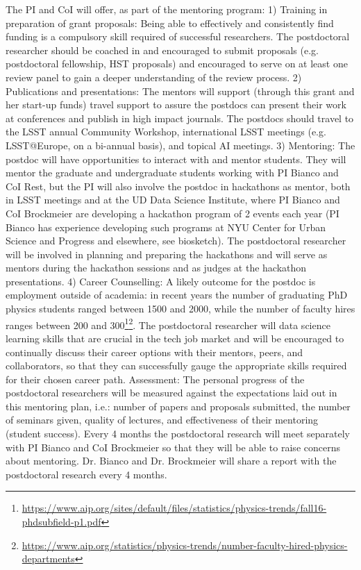 The PI and CoI will offer, as part of the mentoring program: 
1) Training in preparation of grant proposals: Being able to effectively and consistently find funding is a compulsory skill required of successful researchers.  The postdoctoral researcher should be coached in and encouraged to submit proposals (e.g. postdoctoral fellowship, HST proposals) and encouraged to serve on at least one review panel to gain a deeper understanding of the review process. 
2) Publications and presentations: The mentors will support (through this grant and her start-up funds) travel support to assure the postdocs can present their work at conferences and publish in high impact journals.  The postdocs should travel to the LSST annual Community Workshop, international LSST meetings (e.g. LSST@Europe, on a bi-annual basis), and topical AI meetings. 
3) Mentoring: The postdoc will have opportunities to interact with and mentor students. They will mentor the graduate and undergraduate students working with PI Bianco and CoI Rest, but the PI will also involve the postdoc in hackathons as mentor, both in LSST meetings and at the UD Data Science Institute, where PI Bianco and CoI Brockmeier are developing a hackathon program of 2 events each year (PI Bianco has experience developing such programs at NYU Center for Urban Science and Progress and elsewhere, see biosketch).  The postdoctoral researcher will be involved in  planning and preparing the hackathons and will serve as mentors during the hackathon sessions and as judges at the hackathon presentations.
4) Career Counselling: A likely outcome for the postdoc is  employment outside of academia: in recent years the number of graduating PhD physics students ranged between 1500 and 2000, while the number of  faculty hires ranges between 200 and 300\footnote{\url{https://www.aip.org/sites/default/files/statistics/physics-trends/fall16-phdsubfield-p1.pdf}}\footnote{\url{https://www.aip.org/statistics/physics-trends/number-faculty-hired-physics-departments}}.  The postdoctoral researcher will data science learning skills that are crucial in the tech job market and will be encouraged to continually discuss their career options with their mentors, peers, and collaborators, so that they can successfully gauge the appropriate skills required for their chosen career path.
Assessment: The personal progress of the postdoctoral researchers will be measured against the expectations laid out in this mentoring plan, i.e.: number of papers and proposals submitted, the number of seminars given, quality of lectures, and  effectiveness of their mentoring (student success).  Every 4 months the postdoctoral research will meet separately with PI Bianco and CoI Brockmeier so that they will be able to raise concerns about mentoring.  Dr. Bianco and Dr. Brockmeier will share a report with the postdoctoral research every 4 months.  
